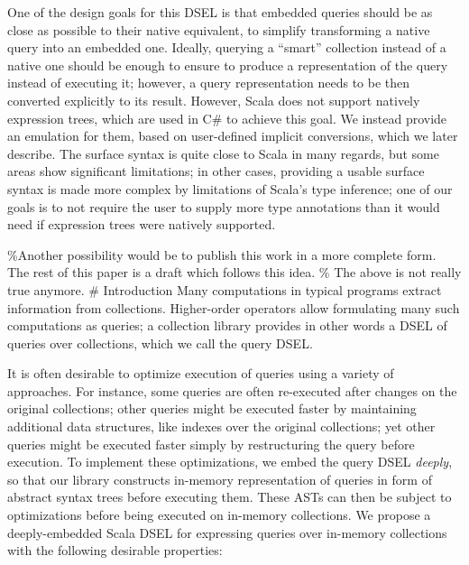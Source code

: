 \documentclass{article}
\begin{document}
One of the design goals for this DSEL is that embedded queries should be
as close as possible to their native equivalent, to simplify
transforming a native query into an embedded one. Ideally, querying a
``smart'' collection instead of a native one should be enough to ensure
to produce a representation of the query instead of executing it;
however, a query representation needs to be then converted explicitly to
its result. However, Scala does not support natively expression trees,
which are used in C\# to achieve this goal. We instead provide an
emulation for them, based on user-defined implicit conversions, which we
later describe. The surface syntax is quite close to Scala in many
regards, but some areas show significant limitations; in other cases,
providing a usable surface syntax is made more complex by limitations of
Scala's type inference; one of our goals is to not require the user to
supply more type annotations than it would need if expression trees were
natively supported.

\%Another possibility would be to publish this work in a more complete
form. The rest of this paper is a draft which follows this idea. \% The
above is not really true anymore. \# Introduction Many computations in
typical programs extract information from collections. Higher-order
operators allow formulating many such computations as queries; a
collection library provides in other words a DSEL of queries over
collections, which we call the query DSEL.

It is often desirable to optimize execution of queries using a variety
of approaches. For instance, some queries are often re-executed after
changes on the original collections; other queries might be executed
faster by maintaining additional data structures, like indexes over the
original collections; yet other queries might be executed faster simply
by restructuring the query before execution. To implement these
optimizations, we embed the query DSEL \emph{deeply}, so that our
library constructs in-memory representation of queries in form of
abstract syntax trees before executing them. These ASTs can then be
subject to optimizations before being executed on in-memory collections.
We propose a deeply-embedded Scala DSEL for expressing queries over
in-memory collections with the following desirable properties:
\end{document}
